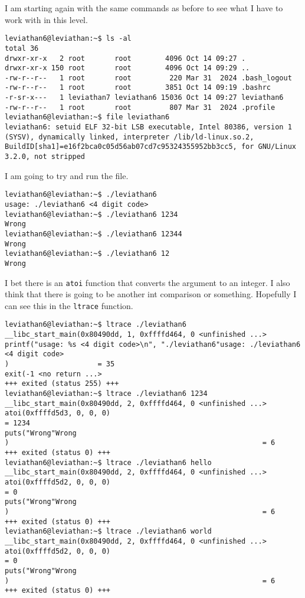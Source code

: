 \documentclass[11pt]{article}
\begin{document}
I am starting again with the same commands as before to see what I have to work with in this level. 
\begin{lstlisting}
leviathan6@leviathan:~$ ls -al
total 36
drwxr-xr-x   2 root       root        4096 Oct 14 09:27 .
drwxr-xr-x 150 root       root        4096 Oct 14 09:29 ..
-rw-r--r--   1 root       root         220 Mar 31  2024 .bash_logout
-rw-r--r--   1 root       root        3851 Oct 14 09:19 .bashrc
-r-sr-x---   1 leviathan7 leviathan6 15036 Oct 14 09:27 leviathan6
-rw-r--r--   1 root       root         807 Mar 31  2024 .profile
leviathan6@leviathan:~$ file leviathan6
leviathan6: setuid ELF 32-bit LSB executable, Intel 80386, version 1 (SYSV), dynamically linked, interpreter /lib/ld-linux.so.2, BuildID[sha1]=e16f2bca0c05d56ab07cd7c95324355952bb3cc5, for GNU/Linux 3.2.0, not stripped
\end{lstlisting}

I am going to try and run the file.
\begin{lstlisting}
leviathan6@leviathan:~$ ./leviathan6
usage: ./leviathan6 <4 digit code>
leviathan6@leviathan:~$ ./leviathan6 1234
Wrong
leviathan6@leviathan:~$ ./leviathan6 12344
Wrong
leviathan6@leviathan:~$ ./leviathan6 12
Wrong
\end{lstlisting}

I bet there is an \verb|atoi| function that converts the argument to an integer. I also think that there is going to be another int comparison or something. Hopefully I can see this in the \verb|ltrace| function.

\begin{lstlisting}
leviathan6@leviathan:~$ ltrace ./leviathan6
__libc_start_main(0x80490dd, 1, 0xffffd464, 0 <unfinished ...>
printf("usage: %s <4 digit code>\n", "./leviathan6"usage: ./leviathan6 <4 digit code>
)                     = 35
exit(-1 <no return ...>
+++ exited (status 255) +++
leviathan6@leviathan:~$ ltrace ./leviathan6 1234
__libc_start_main(0x80490dd, 2, 0xffffd464, 0 <unfinished ...>
atoi(0xffffd5d3, 0, 0, 0)                                                = 1234
puts("Wrong"Wrong
)                                                            = 6
+++ exited (status 0) +++
leviathan6@leviathan:~$ ltrace ./leviathan6 hello
__libc_start_main(0x80490dd, 2, 0xffffd464, 0 <unfinished ...>
atoi(0xffffd5d2, 0, 0, 0)                                                = 0
puts("Wrong"Wrong
)                                                            = 6
+++ exited (status 0) +++
leviathan6@leviathan:~$ ltrace ./leviathan6 world
__libc_start_main(0x80490dd, 2, 0xffffd464, 0 <unfinished ...>
atoi(0xffffd5d2, 0, 0, 0)                                                = 0
puts("Wrong"Wrong
)                                                            = 6
+++ exited (status 0) +++
\end{lstlisting}
\end{document}
